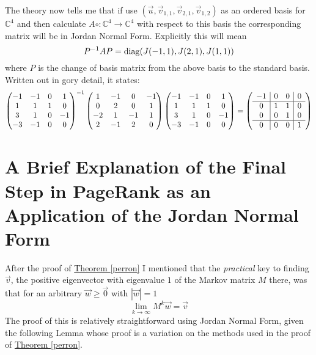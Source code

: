 \documentclass[11pt]{amsbook}
\theoremstyle{definition}
\begin{document}
The theory now tells me that if use $(\vec{u}, \vec{v}_{1,1}, \vec{v}_{2,1}, \vec{v}_{1,2})$ as an ordered basis for $\mathbb{C}^4$ and then calculate $A\circ : \mathbb{C}^4 \to \mathbb{C}^4$ with respect to this basis the corresponding matrix will be in Jordan Normal Form. Explicitly this will mean $$P^{-1}AP = {\rm diag}(J(-1,1), J(2, 1), J(1,1))$$ where $P$ is the change of basis matrix from the above basis to the standard basis. Written out in gory detail, it states: $$\begin{pmatrix} -1 & -1 & 0 & 1  \\ 1 & 1 & 1 & 0   \\ 3 & 1 & 0  & -1  \\ -3 & -1  & 0 & 0 \end{pmatrix}^{-1} \begin{pmatrix} 1 & -1 & 0 & -1 \\ 0 & 2 & 0 & 1 \\ -2 & 1 & -1 & 1 \\ 2 & -1 & 2 &0 \end{pmatrix} \begin{pmatrix} -1 & -1 & 0 & 1  \\ 1 & 1 & 1 & 0   \\ 3 & 1 & 0  & -1  \\ -3 & -1  & 0 & 0 \end{pmatrix} = \left(\begin{array}{c | c  c | c}
 -1 & 0 & 0 & 0 \\ \hline 0 & 1 & 1 & 0 \\ 0 & 0 & 1 & 0 \\ \hline 0 & 0 & 0 & 1 \end{array}\right)$$

\section{A Brief Explanation of the Final Step in PageRank as an Application of the Jordan Normal Form}
After the proof of \hyperref[perron]{Theorem \ref{perron}} I mentioned that the {\it practical} key to finding $\vec{v}$, the positive eigenvector with eigenvalue $1$ of the Markov matrix $M$ there, was that for an arbitrary $\vec{w} \geqslant \vec{0}$ with $|\vec{w}| = 1$ $$\lim_{k\to \infty}M^k \vec{w} = \vec{v}$$  The proof of this is relatively straightforward using Jordan Normal Form, given the following Lemma whose proof is a variation on the methods used in the proof of \hyperref[perron]{Theorem \ref{perron}}.
\end{document}
